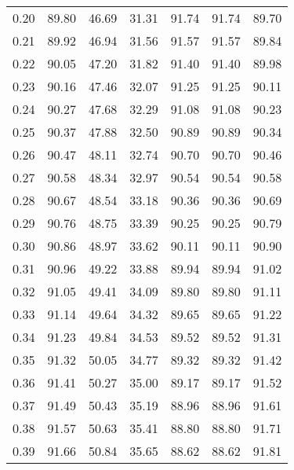 \begin{tabular}{|c|c|c|c|c|c|c|}
      0.20 &     89.80 &     46.69 &      31.31 &   91.74 &      91.74 &         89.70 \\
      0.21 &     89.92 &     46.94 &      31.56 &   91.57 &      91.57 &         89.84 \\
      0.22 &     90.05 &     47.20 &      31.82 &   91.40 &      91.40 &         89.98 \\
      0.23 &     90.16 &     47.46 &      32.07 &   91.25 &      91.25 &         90.11 \\
      0.24 &     90.27 &     47.68 &      32.29 &   91.08 &      91.08 &         90.23 \\
      0.25 &     90.37 &     47.88 &      32.50 &   90.89 &      90.89 &         90.34 \\
      0.26 &     90.47 &     48.11 &      32.74 &   90.70 &      90.70 &         90.46 \\
      0.27 &     90.58 &     48.34 &      32.97 &   90.54 &      90.54 &         90.58 \\
      0.28 &     90.67 &     48.54 &      33.18 &   90.36 &      90.36 &         90.69 \\
      0.29 &     90.76 &     48.75 &      33.39 &   90.25 &      90.25 &         90.79 \\
      0.30 &     90.86 &     48.97 &      33.62 &   90.11 &      90.11 &         90.90 \\
      0.31 &     90.96 &     49.22 &      33.88 &   89.94 &      89.94 &         91.02 \\
      0.32 &     91.05 &     49.41 &      34.09 &   89.80 &      89.80 &         91.11 \\
      0.33 &     91.14 &     49.64 &      34.32 &   89.65 &      89.65 &         91.22 \\
      0.34 &     91.23 &     49.84 &      34.53 &   89.52 &      89.52 &         91.31 \\
      0.35 &     91.32 &     50.05 &      34.77 &   89.32 &      89.32 &         91.42 \\
      0.36 &     91.41 &     50.27 &      35.00 &   89.17 &      89.17 &         91.52 \\
      0.37 &     91.49 &     50.43 &      35.19 &   88.96 &      88.96 &         91.61 \\
      0.38 &     91.57 &     50.63 &      35.41 &   88.80 &      88.80 &         91.71 \\
      0.39 &     91.66 &     50.84 &      35.65 &   88.62 &      88.62 &         91.81 \\

\end{tabular}

